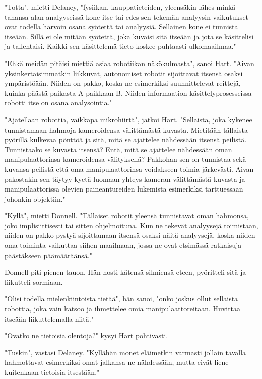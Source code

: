 "Totta", mietti Delaney, "fysiikan, kauppatieteiden, yleensäkin lähes minkä tahansa alan analyyseissä kone itse tai edes sen tekemän analyysin vaikutukset ovat todella harvoin osana syötettä tai analyysiä. Sellainen kone ei tunnista itseään. Sillä ei ole mitään syötettä, joka kuvaisi sitä itseään ja jota se käsittelisi ja tallentaisi. Kaikki sen käsittelemä tieto koskee puhtaasti ulkomaailmaa."


"Ehkä meidän pitäisi miettiä asiaa robotiikan näkökulmasta", sanoi Hart. "Aivan yksinkertaisimmatkin liikkuvat, autonomiset robotit sijoittavat itsensä osaksi ympäristöään. Niiden on pakko, koska ne esimerkiksi suunnittelevat reittejä, kuinka päästä paikasta A paikkaan B. Niiden informaation käsittelyprosesseissa robotti itse on osana analysointia."


"Ajatellaan robottia, vaikkapa mikrohiirtä", jatkoi Hart. "Sellaista, joka kykenee tunnistamaan hahmoja kameroidensa välittämästä kuvasta. Mietitään tällaista pyörillä kulkevaa pönttöä ja sitä, mitä se ajattelee nähdessään itsensä peilistä. Tunnistaako se kuvasta itsensä? Entä, mitä se ajattelee nähdessään oman manipulaattorinsa kameroidensa välityksellä? Pakkohan sen on tunnistaa sekä kuvansa peilistä että oma manipulaattorinsa voidakseen toimia järkevästi. Aivan pakostakin sen täytyy kyetä luomaan yhteys kameran välittämästä kuvasta ja manipulaattorissa olevien paineantureiden lukemista esimerkiksi tarttuessaan johonkin objektiin."


"Kyllä", mietti Donnell. "Tällaiset robotit yleensä tunnistavat oman hahmonsa, joko implisiittisesti tai sitten ohjelmoituna. Kun ne tekevät analyysejä toimistaan, niiden on pakko pystyä sijoittamaan itsensä osaksi näitä analyysejä, koska niiden oma toiminta vaikuttaa siihen maailmaan, jossa ne ovat etsimässä ratkaisuja päästäkseen päämääräänsä."


Donnell piti pienen tauon. Hän nosti kätensä silmiensä eteen, pyöritteli sitä ja liikutteli sormiaan.


"Olisi todella mielenkiintoista tietää", hän sanoi, "onko joskus ollut sellaista robottia, joka vain katsoo ja ihmettelee omia manipulaattoreitaan. Huvittaa itseään liikuttelemalla niitä."


"Ovatko ne tietoisia olentoja?" kysyi Hart pohtivasti.


"Tuskin", vastasi Delaney. "Kyllähän monet eläimetkin varmasti jollain tavalla hahmottavat esimerkiksi omat jalkansa ne nähdessään, mutta eivät liene kuitenkaan tietoisia itsestään."


